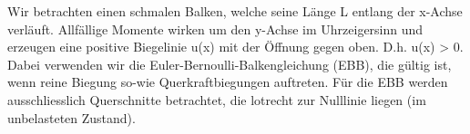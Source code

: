 Wir betrachten einen schmalen Balken, welche seine Länge L entlang der x-Achse verläuft.
Allfällige Momente wirken um den y-Achse im Uhrzeigersinn und erzeugen eine positive Biegelinie u(x) mit der Öffnung gegen oben.
D.h. u(x) > 0.
Dabei verwenden wir die Euler-Bernoulli-Balkengleichung (EBB), die gültig ist, wenn reine Biegung so-wie Querkraftbiegungen auftreten.
Für die EBB werden ausschliesslich Querschnitte betrachtet, die lotrecht zur Nulllinie liegen (im unbelasteten Zustand).